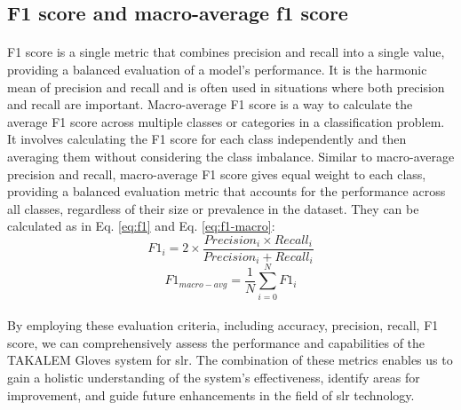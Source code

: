 \subsection{F1 score and macro-average f1 score}
\paragraph{}
F1 score is a single metric that combines precision and recall into a single value, providing a balanced evaluation of a model's performance. It is the harmonic mean of precision and recall and is often used in situations where both precision and recall are important. Macro-average F1 score is a way to calculate the average F1 score across multiple classes or categories in a classification problem. It involves calculating the F1 score for each class independently and then averaging them without considering the class imbalance. Similar to macro-average precision and recall, macro-average F1 score gives equal weight to each class, providing a balanced evaluation metric that accounts for the performance across all classes, regardless of their size or prevalence in the dataset. They can be calculated as in Eq. \ref{eq:f1} and Eq. \ref{eq:f1-macro}:
\begin{equation}
	F1_i = 2 \times \frac{Precision_i \times Recall_i}{Precision_i + Recall_i}
	\label{eq:f1}
\end{equation}
\begin{equation}
	F1_{macro-avg} = \frac{1}{N}  \sum_{i=0}^{N} F1_i
	\label{eq:f1-macro}
\end{equation}
\paragraph{}
By employing these evaluation criteria, including accuracy, precision, recall, F1 score, we can comprehensively assess the performance and capabilities of the TAKALEM Gloves system for \ac{slr}. The combination of these metrics enables us to gain a holistic understanding of the system's effectiveness, identify areas for improvement, and guide future enhancements in the field of \ac{slr} technology.